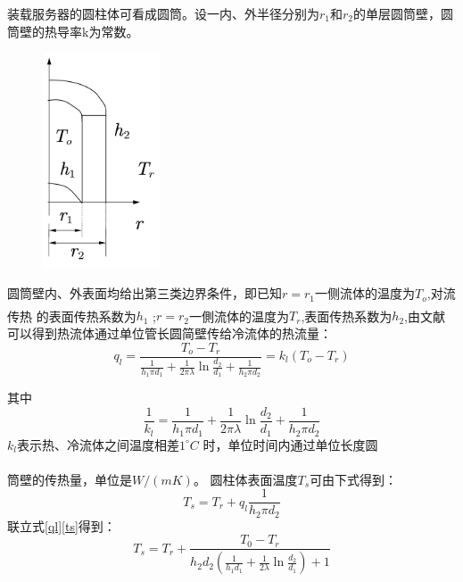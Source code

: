 \documentclass{article}
\newcommand{\upcite}[1]{\textsuperscript{\textsuperscript{\cite{#1}}}}
\begin{document}
   装载服务器的圆柱体可看成圆筒。设一内、外半径分别为$r_1$和$r_2$的单层圆筒壁，圆筒壁的热导率k为常数。
   
   \begin{figure}
   	\includegraphics[width=3.5cm]{img/圆筒传热.png}
   \end{figure}
   圆筒壁内、外表面均给出第三类边界条件，即已知$r=r_1$一侧流体的温度为$T_o$,对流传热
   的表面传热系数为$h_1$ ;$r=r_2$一側流体的温度为$T_r$,表面传热系数为$h_2$,由文献\upcite{传热学}可以得到热流体通过单位管长圆简壁传给冷流体的热流量：
   \begin{equation}
   q_{l}=\frac{T_o-T_r}{\frac{1}{h_{1} \pi d_{1}}+\frac{1}{2 \pi \lambda} \ln \frac{d_{2}}{d_{1}}+\frac{1}{h_{2} \pi d_{2}}} = k_{l}\left(T_o-T_r\right)
   \label{ql}
   \end{equation}
   
  其中$$
  \frac{1}{k_{l}}=\frac{1}{h_{1} \pi d_{1}}+\frac{1}{2 \pi \lambda} \ln \frac{d_{2}}{d_{1}}+\frac{1}{h_{2} \pi d_{2}}
  $$
  $k_{l}$表示热、冷流体之间温度相差$1^{\circ} C$ 时，单位时间内通过单位长度圆
  \\
  \\
  筒壁的传热量，单位是$W/(mK)$。
  圆柱体表面温度$T_s$可由下式得到：
  \begin{equation}
  T_{s}=T_r+q_{l} \frac{1}{h_{2} \pi d_{2}}
  \label{ts}
  \end{equation}
   联立式\eqref{ql}\eqref{ts}得到：
   \begin{equation}
   T_s=T_{r}+\frac{T_{0}-T_{r}}{h_{2} d_{2}\left(\frac{1}{h_{1} d_{1}}+\frac{1}{2 \lambda} \ln \frac{d_{2}}{d_{1}}\right)+1}
   \label{Ts}
   \end{equation}
   
\end{document}
